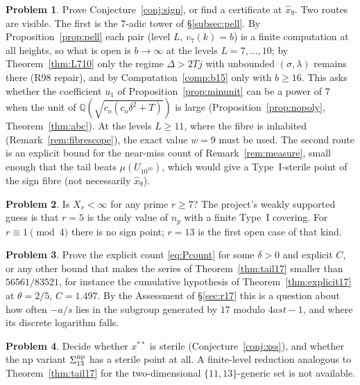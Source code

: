 \documentclass[11pt,reqno]{amsart}
\theoremstyle{definition}
\newtheorem{problem}{Problem}
\newcommand{\Q}{\mathbb Q}
\begin{document}
\begin{problem}
Prove Conjecture~\ref{conj:sign}, or find a certificate at $\hat x_9$.
Two routes are visible.  The first is the $7$-adic tower of
\S\ref{subsec:pell}.  By Proposition~\ref{prop:pell} each pair (level
$L$, $v_7(k)=b$) is a finite computation at all heights, so what is open is
$b\to\infty$ at the levels $L=7,\dots,10$; by Theorem~\ref{thm:L710} only
the regime $\Delta>2Tj$ with unbounded $(\sigma,\lambda)$ remains there
(R98 repair), and by Computation~\ref{comp:b15} only with $b\ge16$.
This asks whether the coefficient $u_1$ of Proposition~\ref{prop:minunit}
can be a power of $7$ when the unit of $\Q(\sqrt{c_o(c_o\delta^2+T)})$ is
large
(Proposition~\ref{prop:nopoly}, Theorem~\ref{thm:abc}).  At the levels $L\ge11$, where the
fibre is inhabited (Remark~\ref{rem:fibrescope}), the exact value $w=9$
must be used.  The second route is an explicit bound for the
near-miss count of Remark~\ref{rem:measure}, small enough that the tail
beats $\mu(U_{10^{10}})$, which would give a
Type~I-sterile point of the sign fibre (not necessarily $\hat x_9$).
\end{problem}

\begin{problem}
Is $X_r<\infty$ for any prime $r\ge7$?  The project's weakly supported
guess is that $r=5$ is the only value of $n_p$ with a finite Type~I
covering.  For $r\equiv1\pmod4$ there is no sign point; $r=13$ is the
first open case of that kind.
\end{problem}

\begin{problem}
Prove the explicit count \eqref{eq:Pcount} for some $\delta>0$ and
explicit $C$, or any other bound that makes the series of
Theorem~\ref{thm:tail17} smaller than $56561/83521$, for instance the
cumulative hypothesis of Theorem~\ref{thm:explicit17} at $\theta=2/5$,
$C=1.497$.  By the Assessment
of \S\ref{sec:r17} this is a question about how often $-a/s$ lies in the
subgroup generated by $17$ modulo $4ast-1$, and where its discrete
logarithm falls.
\end{problem}

\begin{problem}
Decide whether $x^{**}$ is sterile (Conjecture~\ref{conj:xss}), and
whether the np variant $\Sigma^{\rm np}_{13}$ has a sterile point at all.
A finite-level reduction analogous to Theorem~\ref{thm:tail17} for the
two-dimensional $\{11,13\}$-generic set is not available.
\end{problem}
\end{document}
